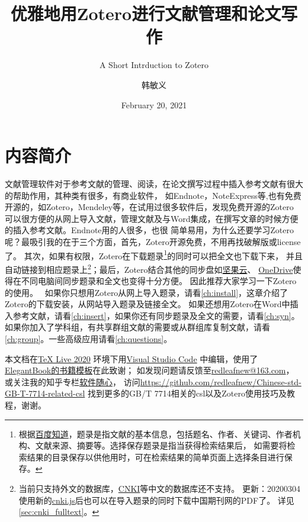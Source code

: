 \documentclass[cn,11pt,chinese]{elegantbook}
\title{优雅地用Zotero进行文献管理和论文写作}
\subtitle{A Short Intrduction to Zotero}
\author{韩敏义}
\institute{南京农业大学\\\kaishu\hspace{1.1cm}温氏食品集团股份有限公司}
\date{February 20, 2021}
\begin{document}
 
\maketitle
\frontmatter

  \chapter*{内容简介}
	
		文献管理软件对于参考文献的管理、阅读，在论文撰写过程中插入参考文献有很大的帮助作用，其种类有很多，有商业软件，
		如Endnote，NoteExpress等,也有免费开源的，如Zotero，Mendeley等，在试用过很多软件后，发现免费开源的Zotero
		可以很方便的从网上导入文献，管理文献及与Word集成，在撰写文章的时候方便的插入参考文献。Endnote用的人很多，也很
		简单易用，为什么还要学习Zotero呢？最吸引我的在于三个方面，首先，Zotero开源免费，不用再找破解版或license了。
		其次，如果有权限，Zotero在下载题录\footnote{根据\href{https://zhidao.baidu.com/question/443193991.html}
		{百度知道}，题录是指文献的基本信息，包括题名、作者、关键词、作者机构、文献来源、摘要等。选择保存题录是指当获得检索结果后，
		如需要将检索结果的目录保存以供他用时，可在检索结果的简单页面上选择条目进行保存。}的同时可以把全文也下载下来，
		并且自动链接到相应题录上\footnote{当前只支持外文的数据库，\href{http://www.cnki.net}{CNKI}等中文的数据库还不支持。
		更新：20200304 使用新的\href{https://github.com/Zotero-CN/translators_CN}{cnki.js}后也可以在导入题录的同时下载中国期刊网的PDF了。
		详见\cref{sec:cnki_fulltext}。}；最后，Zotero结合其他的同步盘如\href{https://www.jianguoyun.com}{坚果云}、
		\href{https://office.live.com/start/OneDrive.aspx}{OneDrive}使得在不同电脑间同步题录和全文也变得十分方便。
		因此推荐大家学习一下Zotero的使用。
		\
		如果你只想用Zotero从网上导入题录，请看\cref{ch:install}，这章介绍了Zotero的下载安装，从网站导入题录及链接全文。
		如果还想用Zotero在Word中插入参考文献，请看\cref{ch:insert}，如果你还有同步题录及全文的需要，请看\cref{ch:syn}。
		如果你加入了学科组，有共享群组文献的需要或从群组库复制文献，请看\cref{ch:group}。一些高级应用请看\cref{ch:questions}。
		
		
		本文档在\href{http://tug.org/texlive/}{\TeX{} Live 2020} 环境下用\href{https://code.visualstudio.com/}{Visual Studio Code}
		中编辑，使用了\href{https://elegantlatex.org/}{ElegantBook的书籍模板}在此致谢；
		如发现问题请反馈至\href{mailto:redleafnew@163.com}{redleafnew@163.com}，
		或关注我的知乎专栏\href{https://zhuanlan.zhihu.com/c_1071081428967743488}{软件随心}，
		访问\href{https://github.com/redleafnew/Chinese-std-GB-T-7714-related-csl}
		{https://github.com/redleafnew/Chinese-std-GB-T-7714-related-csl}
		找到更多的GB/T 7714相关的csl以及Zotero使用技巧及教程，谢谢。
\end{document}
